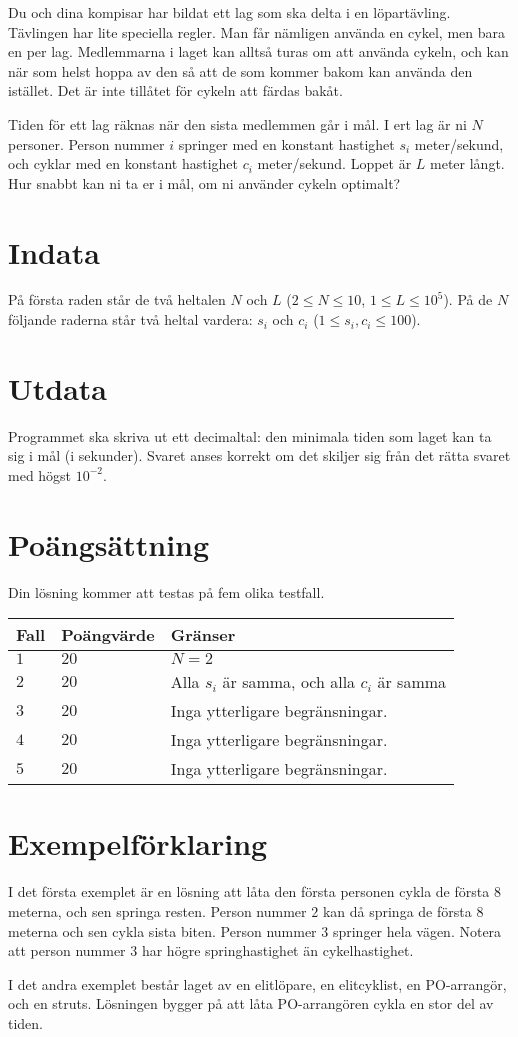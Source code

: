 Du och dina kompisar har bildat ett lag som ska delta i en löpartävling. Tävlingen har lite speciella regler.
Man får nämligen använda en cykel, men bara en per lag. Medlemmarna i laget kan alltså turas om att använda cykeln, och kan
när som helst hoppa av den så att de som kommer bakom kan använda den istället. Det är inte tillåtet för cykeln att färdas bakåt. 

Tiden för ett lag räknas när den sista medlemmen går i mål. I ert lag är ni $N$ personer. Person nummer $i$ springer med en 
konstant hastighet $s_i$ meter/sekund, och cyklar med en konstant hastighet $c_i$ meter/sekund. Loppet är $L$ meter långt.
Hur snabbt kan ni ta er i mål, om ni använder cykeln optimalt?

\section*{Indata}
På första raden står de två heltalen $N$ och $L$ ($2 \leq N \leq 10$, $1 \leq L \leq 10^5$).
På de $N$ följande raderna står två heltal vardera: $s_i$ och $c_i$ ($1 \leq s_i, c_i \leq 100$).

\section*{Utdata}
Programmet ska skriva ut ett decimaltal: den minimala tiden som laget kan ta sig i mål (i sekunder).
Svaret anses korrekt om det skiljer sig från det rätta svaret med högst $10^{-2}$.

\section*{Poängsättning}
Din lösning kommer att testas på fem olika testfall.

\noindent
\begin{tabular}{| l | l | l |}
  \hline
  Fall & Poängvärde & Gränser \\ \hline
  $1$    & $20$        &  $N = 2$ \\ \hline 
  $2$    & $20$        &  Alla $s_i$ är samma, och alla $c_i$ är samma \\ \hline 
  $3$    & $20$        &  Inga ytterligare begränsningar. \\ \hline
  $4$    & $20$        &  Inga ytterligare begränsningar. \\ \hline
  $5$    & $20$        &  Inga ytterligare begränsningar. \\ \hline
\end{tabular}

\section*{Exempelförklaring}
I det första exemplet är en lösning att låta den första personen cykla de första $8$ meterna, och sen springa resten. Person nummer $2$
kan då springa de första $8$ meterna och sen cykla sista biten. Person nummer $3$ springer hela vägen. Notera att person nummer $3$ har
högre springhastighet än cykelhastighet.

I det andra exemplet består laget av en elitlöpare, en elitcyklist, en PO-arrangör, och en struts. Lösningen bygger på att låta PO-arrangören
cykla en stor del av tiden.
